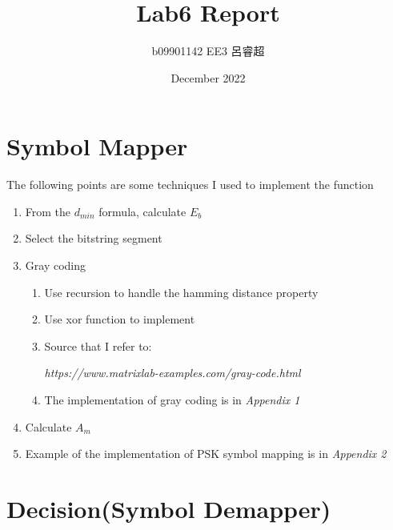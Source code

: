 \documentclass{article}
\title{Lab6 Report}
\author{b09901142 EE3 呂睿超}
\date{December 2022}
\begin{document}
\begin{CJK*}{UTF8}{bsmi}
\maketitle

\section{Symbol Mapper}  
\quad The following points are some techniques I used to implement the function
\begin{enumerate}
    \item From the $d_{min}$ formula, calculate $E_b$
    \item Select the bitstring segment
    \item Gray coding
        \begin{enumerate}
            \item Use recursion to handle the hamming distance property
            \item Use xor function to implement
             \item Source that I refer to: 
             
             \emph{https://www.matrixlab-examples.com/gray-code.html} 
             \item The implementation of gray coding is in \emph{Appendix 1} 
        \end{enumerate}
    \item Calculate $A_m$    
    \item Example of the implementation of PSK symbol mapping is in \emph{Appendix 2} 
\end{enumerate}




\section{Decision(Symbol Demapper)}

\end{CJK*}
\end{document}
